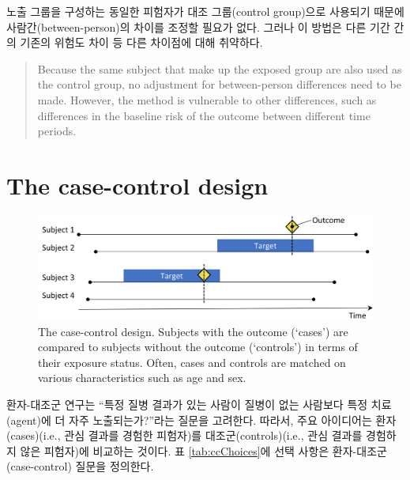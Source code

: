 \documentclass[]{book}
\begin{document}
노출 그룹을 구성하는 동일한 피험자가 대조 그룹(control group)으로 사용되기 때문에 사람간(between-person)의 차이를 조정할 필요가 없다. 그러나 이 방법은 다른 기간 간의 기존의 위험도 차이 등 다른 차이점에 대해 취약하다.

\begin{quote}
Because the same subject that make up the exposed group are also used as the control group, no adjustment for between-person differences need to be made. However, the method is vulnerable to other differences, such as differences in the baseline risk of the outcome between different time periods.
\end{quote}

\hypertarget{the-case-control-design}{%
\section{The case-control design}\label{the-case-control-design}}


\begin{figure}

{\centering \includegraphics[width=0.9\linewidth]{images/PopulationLevelEstimation/caseControl} 

}

\caption{The case-control design. Subjects with the outcome (‘cases’) are compared to subjects without the outcome (‘controls’) in terms of their exposure status. Often, cases and controls are matched on various characteristics such as age and sex.}\label{fig:caseControl}
\end{figure}

환자-대조군 연구\citep{vandenbroucke_2012}는 ``특정 질병 결과가 있는 사람이 질병이 없는 사람보다 특정 치료(agent)에 더 자주 노출되는가?''라는 질문을 고려한다. 따라서, 주요 아이디어는 환자(cases)(i.e., 관심 결과를 경험한 피험자)를 대조군(controls)(i.e., 관심 결과를 경험하지 않은 피험자)에 비교하는 것이다. 표 \ref{tab:ccChoices}에 선택 사항은 환자-대조군(case-control) 질문을 정의한다.   
\end{document}

